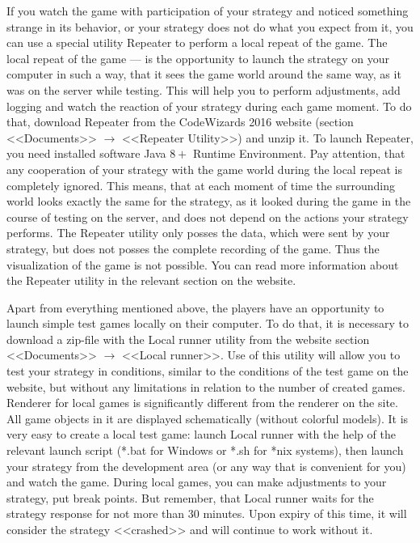 If you watch the game with participation of your strategy and noticed something strange in its behavior, or your strategy does not do what you
expect from it, you can use a special utility Repeater to perform a local repeat of the game. The local repeat of the
game --- is the opportunity to launch the strategy on your computer in such a way, that it sees the game world around the same way, as it was on
the server while testing. This will help you to perform adjustments, add logging and watch the reaction of your strategy during each game
moment. To do that, download Repeater from the CodeWizards 2016 website (section <<Documents>> $\rightarrow$ <<Repeater Utility>>) and unzip it.
To launch Repeater, you need installed software Java $8+$ Runtime Environment. Pay attention, that any cooperation of your
strategy with the game world during the local repeat is completely ignored. This means, that at each moment of time the surrounding world
looks exactly the same for the strategy, as it looked during the game in the course of testing on the server, and does not depend on the actions your strategy
performs. The Repeater utility only posses the data, which were sent by your strategy, but does not posses the complete recording of the game. Thus
the visualization of the game is not possible. You can read more information about the Repeater utility in the relevant section on the website.
 
Apart from everything mentioned above, the players have an opportunity to launch simple test games locally on their computer. To do that,
it is necessary to download a zip-file with the Local runner utility from the website section <<Documents>> $\rightarrow$ <<Local runner>>. Use of this
utility will allow you to test your strategy in conditions, similar to the conditions of the test game on the website, but without any limitations in relation to the
number of created games. Renderer for local games is significantly different from the renderer on the site. All game objects in it are displayed
schematically (without colorful models). It is very easy to create a local test game: launch Local runner with the help of
the relevant launch script (*.bat for Windows or *.sh for *nix systems), then launch your strategy from the development area (or any way
that is convenient for you) and watch the game. During local games, you can make adjustments to your strategy, put break points.
But remember, that Local runner waits for the strategy response for not more than $30$ minutes. Upon expiry of this time, it will consider
the strategy <<crashed>> and will continue to work without it.
 
